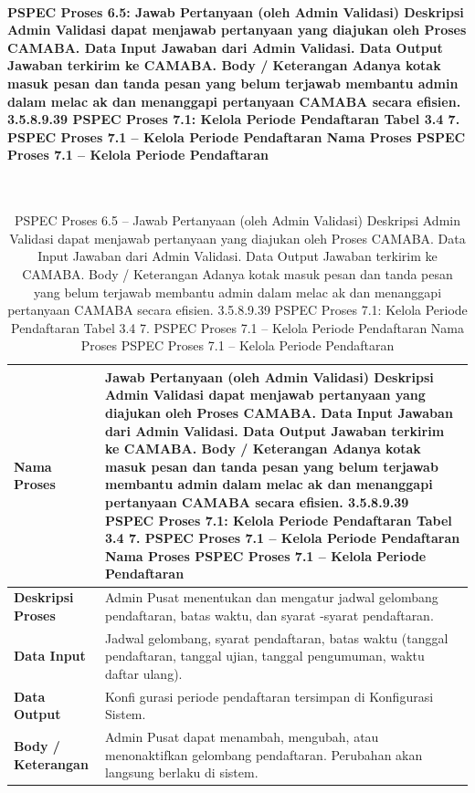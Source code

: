 \paragraph{PSPEC Proses 6.5: Jawab Pertanyaan (oleh Admin Validasi) Deskripsi Admin Validasi dapat menjawab pertanyaan yang diajukan oleh Proses CAMABA. Data Input Jawaban dari Admin Validasi. Data Output Jawaban terkirim ke CAMABA. Body / Keterangan Adanya kotak masuk pesan dan tanda pesan yang belum terjawab membantu admin dalam melac ak dan menanggapi pertanyaan CAMABA secara efisien. 3.5.8.9.39 PSPEC Proses 7.1: Kelola Periode Pendaftaran Tabel 3.4 7. PSPEC Proses 7.1 – Kelola Periode Pendaftaran Nama Proses PSPEC Proses 7.1 – Kelola Periode Pendaftaran}~\\
\begin{longtable}{|p{}|p{}|}
	\caption{PSPEC Proses 6.5 -- Jawab Pertanyaan (oleh Admin Validasi) Deskripsi Admin Validasi dapat menjawab pertanyaan yang diajukan oleh Proses CAMABA. Data Input Jawaban dari Admin Validasi. Data Output Jawaban terkirim ke CAMABA. Body / Keterangan Adanya kotak masuk pesan dan tanda pesan yang belum terjawab membantu admin dalam melac ak dan menanggapi pertanyaan CAMABA secara efisien. 3.5.8.9.39 PSPEC Proses 7.1: Kelola Periode Pendaftaran Tabel 3.4 7. PSPEC Proses 7.1 – Kelola Periode Pendaftaran Nama Proses PSPEC Proses 7.1 – Kelola Periode Pendaftaran}
	\label{table:3.pspec65}\\
	\hline
	\textbf{Nama Proses} & Jawab Pertanyaan (oleh Admin Validasi) Deskripsi Admin Validasi dapat menjawab pertanyaan yang diajukan oleh Proses CAMABA. Data Input Jawaban dari Admin Validasi. Data Output Jawaban terkirim ke CAMABA. Body / Keterangan Adanya kotak masuk pesan dan tanda pesan yang belum terjawab membantu admin dalam melac ak dan menanggapi pertanyaan CAMABA secara efisien. 3.5.8.9.39 PSPEC Proses 7.1: Kelola Periode Pendaftaran Tabel 3.4 7. PSPEC Proses 7.1 – Kelola Periode Pendaftaran Nama Proses PSPEC Proses 7.1 – Kelola Periode Pendaftaran \\
	\hline
	\textbf{Deskripsi Proses} & Admin Pusat menentukan dan mengatur jadwal gelombang pendaftaran, batas waktu, dan syarat -syarat pendaftaran. \\
	\hline
	\textbf{Data Input} & Jadwal gelombang, syarat pendaftaran, batas waktu (tanggal pendaftaran, tanggal ujian, tanggal pengumuman, waktu daftar ulang). \\
	\hline
	\textbf{Data Output} & Konfi gurasi periode pendaftaran tersimpan di Konfigurasi Sistem. \\
	\hline
	\textbf{Body / Keterangan} & Admin Pusat dapat menambah, mengubah, atau menonaktifkan gelombang pendaftaran. Perubahan akan langsung berlaku di sistem. \\
	\hline
\end{longtable}


